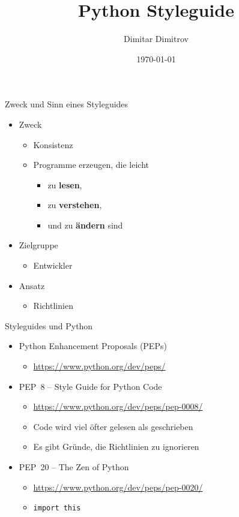 \documentclass{beamer}
\title{Python Styleguide}
\author{Dimitar Dimitrov}
\date{\today}
\begin{document}
\begin{frame}[plain]
  \titlepage
  \vfill
\end{frame}

\begin{frame}{Zweck und Sinn eines Styleguides}
  \begin{itemize}
    \item Zweck
    \begin{itemize}
      \item Konsistenz
      \item Programme erzeugen, die leicht
      \begin{itemize}
        \item zu \textbf{lesen},
        \item zu \textbf{verstehen},
        \item und zu \textbf{ändern} sind
      \end{itemize}
    \end{itemize}
    \item Zielgruppe
    \begin{itemize}
      \item Entwickler
    \end{itemize}
    \item Ansatz
    \begin{itemize}
      \item Richtlinien
    \end{itemize}
  \end{itemize}
\end{frame}

\begin{frame}{Styleguides und Python}
  \begin{itemize}
    \item Python Enhancement Proposals (PEPs)
      \begin{itemize}
        \item \url{https://www.python.org/dev/peps/}
      \end{itemize}
    \item PEP~8 -- Style Guide for Python Code
      \begin{itemize}
        \item \url{https://www.python.org/dev/peps/pep-0008/}
        \item Code wird viel öfter gelesen als geschrieben
        \item Es gibt Gründe, die Richtlinien zu ignorieren
      \end{itemize}
    \item PEP~20 -- The Zen of Python
      \begin{itemize}
        \item \url{https://www.python.org/dev/peps/pep-0020/}
        \item \texttt{import this}
      \end{itemize}
  \end{itemize}
\end{frame}
\end{document}
